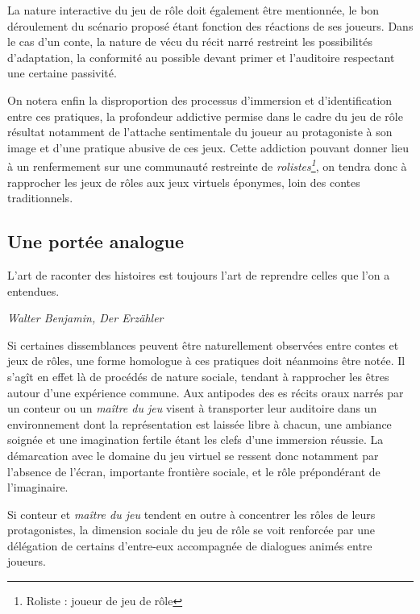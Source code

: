 La nature interactive du jeu de rôle doit également être mentionnée, le bon déroulement du scénario proposé étant fonction des réactions de ses joueurs. Dans le cas d'un conte, la nature de vécu du récit narré restreint les possibilités d'adaptation, la conformité au possible devant primer et l'auditoire respectant une certaine passivité.

On notera enfin la disproportion des processus d'immersion et d'identification entre ces pratiques, la profondeur addictive permise dans le cadre du jeu de rôle résultat notamment de l'attache sentimentale du joueur au protagoniste à son image et d'une pratique abusive de ces jeux. Cette addiction pouvant donner lieu à un renfermement sur une communauté restreinte de \textit{rolistes\footnote{Roliste : joueur de jeu de rôle}}, on tendra donc à rapprocher les jeux de rôles aux jeux virtuels éponymes, loin des contes traditionnels.



\subsection{Une portée analogue}

\begin{shadequote}
L'art de raconter des histoires est toujours l'art de reprendre celles que l'on a entendues. \par\emph{Walter Benjamin, Der Erzähler}
\end{shadequote}


Si certaines dissemblances peuvent être naturellement observées entre contes et jeux de rôles, une forme homologue à ces pratiques doit néanmoins être notée. Il s'agît en effet là de procédés de nature sociale, tendant à rapprocher les êtres autour d'une expérience commune. Aux antipodes des es récits oraux narrés par un conteur ou un \textit{maître du jeu} visent à transporter leur auditoire dans un environnement dont la représentation est laissée libre à chacun, une ambiance soignée et une imagination fertile étant les clefs d'une immersion réussie. La démarcation avec le domaine du jeu virtuel se ressent donc notamment par l'absence de l'écran, importante frontière sociale, et le rôle prépondérant de l'imaginaire.

Si conteur et \textit{maître du jeu} tendent en outre à concentrer les rôles de leurs protagonistes, la dimension sociale du jeu de rôle se voit renforcée par une délégation de certains d'entre-eux accompagnée de dialogues animés entre joueurs.\\


